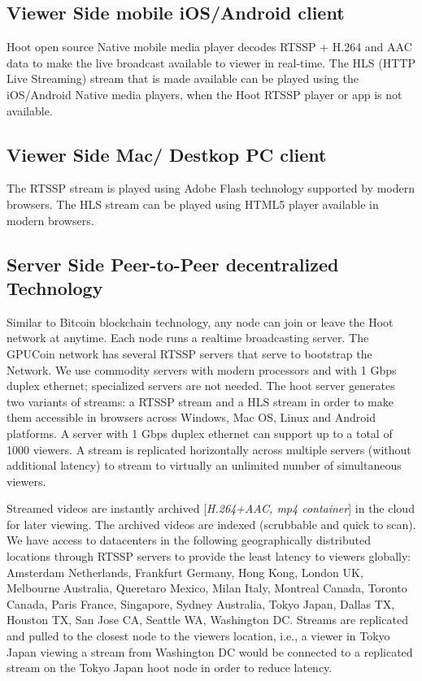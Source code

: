 \subsection{Viewer Side mobile iOS/Android client }
 Hoot open source Native mobile media player decodes RTSSP + H.264 and AAC data to make the live broadcast available to viewer in real-time. The HLS (HTTP Live Streaming) stream that is made available can be played using the iOS/Android Native media players, when the Hoot RTSSP player or app is not available.

\subsection{Viewer Side Mac/ Destkop PC client} 
The RTSSP stream is played using Adobe Flash technology supported by modern browsers. The HLS stream can be played using HTML5 player available in modern browsers.

\subsection{Server Side Peer-to-Peer decentralized Technology}
Similar to Bitcoin blockchain technology, any node can join or leave the Hoot network at anytime. Each node runs a realtime broadcasting server.
The GPUCoin network has several RTSSP servers that serve to bootstrap the Network. We use commodity servers with modern processors and with 1 Gbps duplex ethernet; specialized servers are not needed. The hoot server generates two variants of streams: a RTSSP stream and a HLS stream in order to make them accessible in browsers across Windows, Mac OS, Linux and Android platforms. A server with 1 Gbps duplex ethernet can support up to a total of 1000 viewers. A stream is replicated horizontally across multiple servers (without additional latency) to stream to virtually an unlimited number of simultaneous viewers. 

Streamed videos are instantly archived [\emph{H.264+AAC, mp4 container}] in the cloud for later viewing. The archived videos are indexed (scrubbable and quick to scan). We have access to datacenters in the following geographically distributed locations through RTSSP servers to provide the least latency to viewers globally: Amsterdam Netherlands, Frankfurt Germany, Hong Kong, London UK, Melbourne Australia, Queretaro Mexico, Milan Italy, Montreal Canada, Toronto Canada, Paris France, Singapore, Sydney Australia, Tokyo Japan, Dallas TX, Houston TX, San Jose CA, Seattle WA, Washington DC. 
Streams are replicated and pulled to the closest node to the viewers location, i.e., a viewer in Tokyo Japan viewing a stream from Washington DC would be connected to a replicated stream on the Tokyo Japan hoot node in order to reduce latency.

